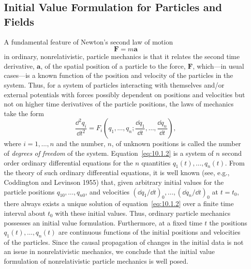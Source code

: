 
\subsection{Initial Value Formulation for Particles and Fields}\label{sec:10.1}
\setcounter{theorem}{0}

A fundamental feature of Newton's second law of motion
\begin{equation}
  \mathbf{F}=m\mathbf{a}
  \tag{10.1.1}\label{eq:10.1.1}
\end{equation}
in ordinary, nonrelativistic, particle mechanics is that it relates the second time
derivative, \(\mathbf{a}\), of the spatial position of a particle to the force, \(\mathbf{F}\),
which---in usual cases---is a known function of the position and velocity of the
particles in the system. Thus, for a system of particles interacting with themselves
and/or external potentials with forces possibly dependent on positions and velocities
but not on higher time derivatives of the particle positions, the laws of mechanics
take the form
\begin{equation}
  \frac{\dd^2q_i}{\dd t^2}
  =F_i\left(q_1,\ldots,q_n;
    \frac{\dd q_1}{\dd t},\ldots,\frac{\dd q_n}{\dd t}\right),
  \tag{10.1.2}\label{eq:10.1.2}
\end{equation}
where \(i=1,\ldots,n\) and the number, \(n\), of unknown positions is called the
number of \emph{degrees of freedom} of the system. Equation~\eqref{eq:10.1.2} is a
system of \(n\) second order ordinary differential equations for the \(n\) quantities
\(q_1(t),\ldots,q_n(t)\). From the theory of such ordinary differential equations, it
is well known (see, e.g., Coddington and Levinson 1955) that, given arbitrary initial
values for the particle positions \(q_{10},\ldots,q_{n0}\), and velocities
\((\dd q_1/\dd t)_0,\ldots,(\dd q_n/\dd t)_0\) at \(t=t_0\), there always exists a
unique solution of equation~\eqref{eq:10.1.2} over a finite time interval about \(t_0\)
with these initial values. Thus, ordinary particle mechanics possesses an initial value
formulation. Furthermore, at a fixed time \(t\) the positions
\(q_1(t),\ldots,q_n(t)\) are continuous functions of the initial positions and velocities
of the particles. Since the causal propagation of changes in the initial data is not an
issue in nonrelativistic mechanics, we conclude that the initial value formulation of
nonrelativistic particle mechanics is well posed.

